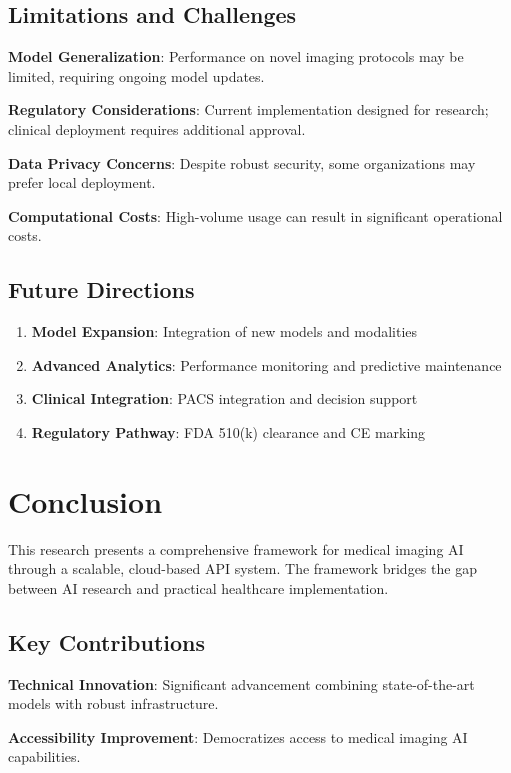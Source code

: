 \documentclass[12pt,a4paper]{article}
\begin{document}
\subsection{Limitations and Challenges}

\textbf{Model Generalization}: Performance on novel imaging protocols may be limited, requiring ongoing model updates.

\textbf{Regulatory Considerations}: Current implementation designed for research; clinical deployment requires additional approval.

\textbf{Data Privacy Concerns}: Despite robust security, some organizations may prefer local deployment.

\textbf{Computational Costs}: High-volume usage can result in significant operational costs.

\subsection{Future Directions}

\begin{enumerate}
    \item \textbf{Model Expansion}: Integration of new models and modalities
    \item \textbf{Advanced Analytics}: Performance monitoring and predictive maintenance
    \item \textbf{Clinical Integration}: PACS integration and decision support
    \item \textbf{Regulatory Pathway}: FDA 510(k) clearance and CE marking
\end{enumerate}

\section{Conclusion}

This research presents a comprehensive framework for medical imaging AI through a scalable, cloud-based API system. The framework bridges the gap between AI research and practical healthcare implementation.

\subsection{Key Contributions}

\textbf{Technical Innovation}: Significant advancement combining state-of-the-art models with robust infrastructure.

\textbf{Accessibility Improvement}: Democratizes access to medical imaging AI capabilities.
\end{document}

